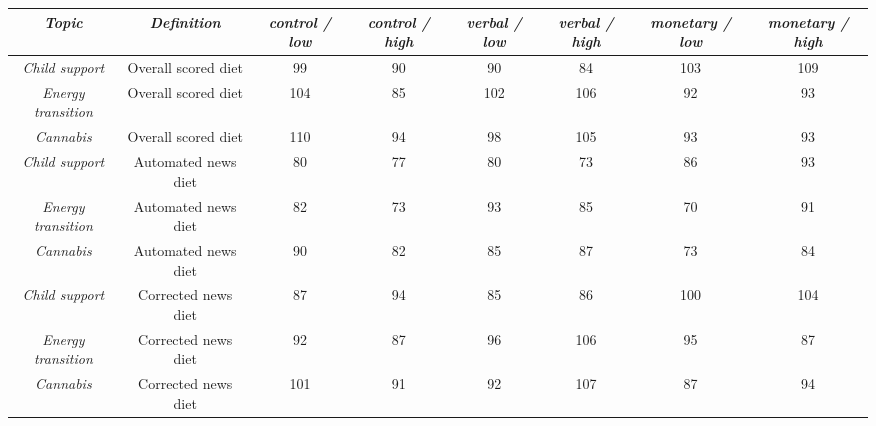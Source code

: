 \begin{tabular}{c c c c c c c c}
      \hline
      \textit{Topic} & \textit{Definition} & \textit{control / low} & \textit{control / high} & \textit{verbal / low} & \textit{verbal / high} & \textit{monetary / low} & \textit{monetary / high} \\
      \hline
      \textit{Child support} & Overall scored diet & 99 & 90 & 90 & 84 & 103 & 109 \\
      \textit{Energy transition} & Overall scored diet & 104 & 85 & 102 & 106 & 92 & 93 \\
      \textit{Cannabis} & Overall scored diet & 110 & 94 & 98 & 105 & 93 & 93 \\
      \textit{Child support} & Automated news diet & 80 & 77 & 80 & 73 & 86 & 93 \\
      \textit{Energy transition} & Automated news diet & 82 & 73 & 93 & 85 & 70 & 91 \\
      \textit{Cannabis} & Automated news diet & 90 & 82 & 85 & 87 & 73 & 84 \\
      \textit{Child support} & Corrected news diet & 87 & 94 & 85 & 86 & 100 & 104 \\
      \textit{Energy transition} & Corrected news diet & 92 & 87 & 96 & 106 & 95 & 87 \\
      \textit{Cannabis} & Corrected news diet & 101 & 91 & 92 & 107 & 87 & 94 \\
      \hline
    \end{tabular}
